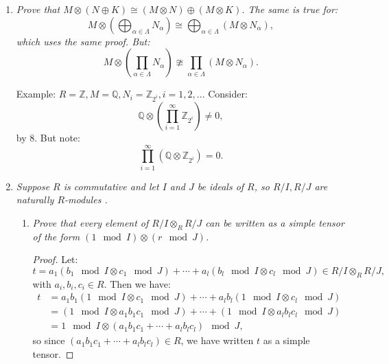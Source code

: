 \documentclass[12pt]{amsbook}
\theoremstyle{plain}
\numberwithin{section}{chapter}
\numberwithin{equation}{chapter}
\theoremstyle{definition}
\theoremstyle{remark}
\newcommand{\z}{\mathbb{Z}}
\newcommand{\Q}{\mathbb{Q}}
\newcommand{\bee}{\begin{equation}\begin{aligned}}
\newcommand{\eee}{\end{aligned}\end{equation}}
\newcommand{\tens}{\otimes}
\begin{document}
\begin{enumerate}[label=\arabic*.]
\begin{enumerate}
\item \textit{Show that if $\sum m_i \tens n_i = 0$ in $M \tens N$ where the $n_i$ are merely assumed to be $R$-linearly independent, then it is not necessarily true that all the $m_i$ are 0. [Consider $R = \z,n  =1,M = \z/2\z$, and the element $1 \tens 2$.] }
\begin{proof}
Note that now we relax the assumption that our elements from $R^n$ generate $R^n$. So now they are only linearly independent. We have:
$$
1 \tens 2 = 2 \tens 1 = 0 \tens 1 = 0,
$$
but $1 \neq 0 \in \z/2\z$, and $2$ is just a single element of some $R$ module over $R$, so it is linearly independent. So we have found a counterexample. 
\end{proof}
\end{enumerate}

\setcounter{enumi}{14}

\item \textit{Prove that $M \tens (N \oplus K) \cong (M \tens N) \oplus (M \tens K)$. The same is true for: 
$$
M \tens \left( \bigoplus_{\alpha \in \Lambda} N_\alpha \right) \cong \bigoplus_{\alpha \in \Lambda}(M \tens N_\alpha),
$$ 
which uses the same proof. But:
$$
M \tens \left( \prod_{\alpha \in \Lambda} N_\alpha \right)\ncong \prod_{\alpha \in \Lambda}(M \tens N_\alpha).
$$
}

Example: $R = \z,M = \Q,N_i = \z_{2^i},i = 1,2,...$ Consider:
$$
\Q \tens \left(\prod_{i = 1}^\infty \z_{2^i} \right) \neq 0,
$$
by 8.  But note:
$$
\prod_{i  =1}^\infty\left(\Q \tens \z_{2^i} \right) = 0. 
$$

\item \textit{Suppose $R$ is commutative and let $I$ and $J$ be ideals of $R$, so $R/I,R/J$ are naturally $R$-modules . }

\begin{enumerate}
\item \textit{Prove that every element of $R/I \tens_R R/J$ can be written as a simple tensor of the form $(1 \mod I) \tens (r \mod J)$. }

\begin{proof}
Let:
 $$
 t = a_1(b_1 \mod I \otimes c_1 \mod J) + \cdots + a_l(b_l\mod I \otimes c_l\mod J)  \in R/I \tens_R R/J,
 $$
 with $a_i,b_i,c_i \in R$. Then we have: 
 \bee
 t &= a_1b_1(1 \mod I \otimes c_1 \mod J) + \cdots + a_lb_l(1 \mod I \otimes c_l\mod J)\\
 &= (1 \mod I \otimes a_1b_1c_1 \mod J) + \cdots + (1 \mod I \otimes a_lb_lc_l\mod J)\\
 &= 1 \mod I \tens (a_1b_1c_1 + \cdots + a_lb_lc_l) \mod J,
 \eee
 so since $(a_1b_1c_1 + \cdots + a_lb_lc_l) \in R$, we have written $t$ as a simple tensor. 
\end{proof}


\end{enumerate}
\end{enumerate}
\end{document}
